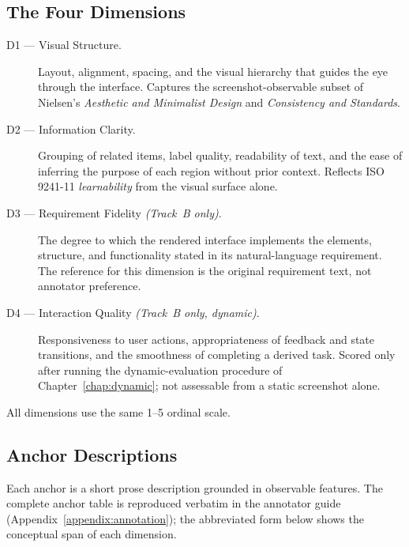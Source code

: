 \subsection{The Four Dimensions}

\begin{description}
  \item[D1 — Visual Structure.] Layout, alignment, spacing, and the
    visual hierarchy that guides the eye through the interface.
    Captures the screenshot-observable subset of Nielsen's
    \emph{Aesthetic and Minimalist Design} and \emph{Consistency and
    Standards}.

  \item[D2 — Information Clarity.] Grouping of related items, label
    quality, readability of text, and the ease of inferring the purpose
    of each region without prior context. Reflects ISO 9241-11
    \emph{learnability} from the visual surface alone.

  \item[D3 — Requirement Fidelity \textit{(Track~B only)}.] The degree
    to which the rendered interface implements the elements,
    structure, and functionality stated in its natural-language
    requirement. The reference for this dimension is the original
    requirement text, not annotator preference.

  \item[D4 — Interaction Quality \textit{(Track~B only, dynamic)}.]
    Responsiveness to user actions, appropriateness of feedback and
    state transitions, and the smoothness of completing a derived
    task. Scored only after running the dynamic-evaluation procedure
    of Chapter~\ref{chap:dynamic}; not assessable from a static
    screenshot alone.
\end{description}

All dimensions use the same 1--5 ordinal scale.

\subsection{Anchor Descriptions}

Each anchor is a short prose description grounded in observable
features. The complete anchor table is reproduced verbatim in the
annotator guide (Appendix~\ref{appendix:annotation}); the abbreviated
form below shows the conceptual span of each dimension.

